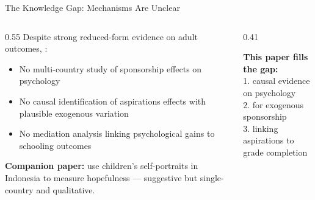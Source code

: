 \documentclass[aspectratio=169, 10pt]{beamer}
\begin{document}
\begin{frame}{The Knowledge Gap: Mechanisms Are Unclear}
  \begin{columns}
    \begin{column}{0.55\textwidth}
      Despite strong reduced-form evidence on adult outcomes, :
      \begin{itemize}
        \item No multi-country study of sponsorship effects on psychology
        \item No causal identification of aspirations effects with plausible exogenous variation
        \item No mediation analysis linking psychological gains to schooling outcomes
      \end{itemize}
      \vspace{0.5em}
      \textbf{Companion paper:} \citealt{Glewwe2018} use children's self-portraits in Indonesia to measure hopefulness --- suggestive but single-country and qualitative.
    \end{column}
    \begin{column}{0.41\textwidth}
      \begin{keybox}
        \textbf{This paper fills the gap:}\\[0.4em]
        1.  causal evidence on psychology\\[0.3em]
        2.  for exogenous sponsorship\\[0.3em]
        3.  linking aspirations to grade completion
      \end{keybox}
    \end{column}
  \end{columns}
\end{frame}
\end{document}
